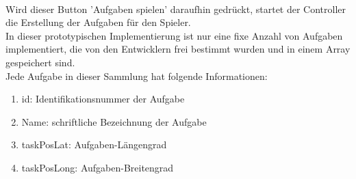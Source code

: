 \\
Wird dieser Button 'Aufgaben spielen' daraufhin gedrückt, startet der Controller die Erstellung der Aufgaben für den Spieler.
\\
In dieser prototypischen Implementierung ist nur eine fixe Anzahl von Aufgaben implementiert, die von den Entwicklern frei bestimmt wurden und in einem Array gespeichert sind.
\\
Jede Aufgabe in dieser Sammlung hat folgende Informationen:
\begin{enumerate}
\item id: Identifikationsnummer der Aufgabe
\item Name: schriftliche Bezeichnung der Aufgabe
\item taskPosLat: Aufgaben-Längengrad
\item taskPosLong: Aufgaben-Breitengrad
\end{enumerate}

